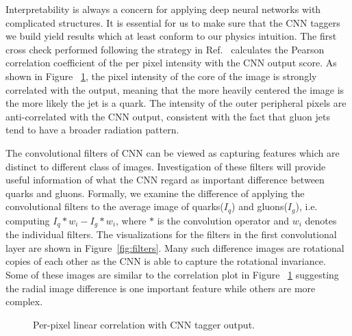 Interpretability is always a concern for applying deep neural networks
with complicated structures. It is essential for us to make sure that the
CNN taggers we build yield results which at least conform to our physics intuition.
The first cross check performed following the strategy in Ref.~\cite{deOliveira:2015xxd} calculates
the Pearson correlation coefficient of the per pixel intensity with the CNN output score.
As shown in Figure ~\ref{fig:correlation}, the pixel intensity of the core of the image is strongly
 correlated with the output, meaning that the more heavily centered the image is the more likely
the jet is a quark. The intensity of the outer peripheral pixels are anti-correlated with
the CNN output, consistent with the fact that gluon jets tend to have a broader radiation pattern. 

The convolutional filters of CNN can be viewed as capturing features which are distinct to different
class of images. Investigation of these filters will provide useful information of what the CNN regard as
important difference between quarks and gluons. Formally, we examine the difference of applying the
convolutional filters to the average image of quarks($I_q$) and gluons($I_g$), i.e. computing $I_q * w_i - I_g * w_i$,
where $*$ is the convolution operator and $w_i$ denotes the individual filters. The visualizations for the
filters in the first convolutional layer are shown in Figure~\ref{fig:filters}.
Many such difference images are rotational copies of each other as the CNN is able to capture the rotational
invariance. Some of these images are similar to the correlation plot in Figure ~\ref{fig:correlation} suggesting
the radial image difference is one important feature while others are more complex. 

\begin{figure}[htbp]
\begin{center}
\caption{
Per-pixel linear correlation with CNN tagger output.
}
\label{fig:correlation}
\end{center}
\end{figure}

